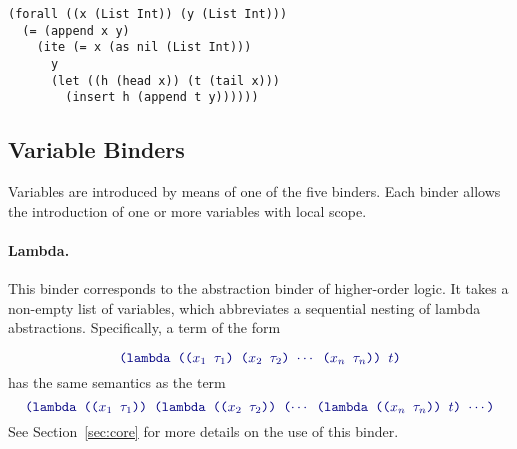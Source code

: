 \begin{lstlisting}[linewidth=29em]
(forall ((x (List Int)) (y (List Int)))
  (= (append x y)
    (ite (= x (as nil (List Int)))
      y
      (let ((h (head x)) (t (tail x)))
        (insert h (append t y))))))
\end{lstlisting}


\subsection{Variable Binders}  \label{sec:binders}

\begin{newver}

Variables are introduced by means of one of the five binders.
Each binder allows the introduction of one or more variables with local scope.

\paragraph{Lambda.}


This binder corresponds to the abstraction binder of higher-order logic.
It takes a non-empty list of variables, 
which abbreviates a sequential nesting of lambda abstractions.
Specifically, a term of the form

\begin{equation} \label{eq:lambda}
  \expr{
  (lambda (($x_1$ $\tau_1$) ($x_2$ $\tau_2$) $\cdots$ ($x_n$ $\tau_n$)) 
    $t$)
  }
\end{equation}
has the same semantics as the term
%
  \begin{equation} \label{eq:nested-lambda}
  \expr{
   (lambda (($x_1$ $\tau_1$)) 
   (lambda (($x_2$ $\tau_2$)) ($\cdots$ 
   (lambda (($x_n$ $\tau_n$)) $t$) $\cdots$)
  }
  \end{equation}
  See Section~\ref{sec:core} for more details on the use of this binder.

\end{newver}

